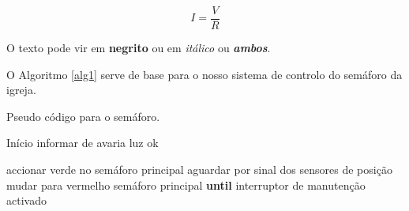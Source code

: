 \begin{equation}\label{for:ohm}
	I=\frac{V}{R}
\end{equation}

O texto pode vir em \textbf{negrito} ou em \textit{itálico} ou \textbf{\textit{ambos}}.

O Algoritmo \ref{alg1} serve de base para o nosso sistema de controlo do semáforo da igreja.
\begin{algorithm}
	\caption{Pseudo código para o semáforo.}
	\label{alg1}
	\begin{algorithmic}
		\STATE Início
				\STATE informar de avaria
			\ELSE
				\STATE luz ok
			\ENDIF 
		\ENDFOR
		
		\LOOP
			\STATE accionar verde no semáforo principal
			\STATE aguardar por sinal dos sensores de posição
				\STATE mudar para vermelho semáforo principal
			\ENDIF
		\ENDLOOP
		\STATE \textbf{until} interruptor de manutenção activado
	\end{algorithmic}
\end{algorithm}

